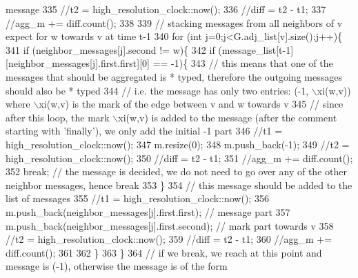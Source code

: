\begin{DoxyCode}
{       message}
335 \textcolor{comment}{          //t2 = high\_resolution\_clock::now();}
336 \textcolor{comment}{          //diff = t2 - t1;}
337 \textcolor{comment}{          //agg\_m += diff.count();}
338 \textcolor{comment}{}
339 \textcolor{comment}{          // stacking messages from all neighbors of v expect for w towards v at time t-1}
340 \textcolor{comment}{          for (int j=0;j<G.adj\_list[v].size();j++)\{}
341 \textcolor{comment}{            if (neighbor\_messages[j].second != w)\{}
342 \textcolor{comment}{              if (message\_list[t-1][neighbor\_messages[j].first.first][0] == -1)\{}
343 \textcolor{comment}{                // this means that one of the messages that should be aggregated is * typed, therefore the
       outgoing messages should also be * typed}
344 \textcolor{comment}{                // i.e. the message has only two entries: (-1, \(\backslash\)xi(w,v)) where \(\backslash\)xi(w,v) is the mark of the
       edge between v and w towards v}
345 \textcolor{comment}{                // since after this loop, the mark \(\backslash\)xi(w,v) is added to the message (after the comment
       starting with 'finally'), we only add the initial -1 part}
346 \textcolor{comment}{                //t1 = high\_resolution\_clock::now();}
347 \textcolor{comment}{                m.resize(0);}
348 \textcolor{comment}{                m.push\_back(-1);}
349 \textcolor{comment}{                //t2 = high\_resolution\_clock::now();}
350 \textcolor{comment}{                //diff = t2 - t1;}
351 \textcolor{comment}{                //agg\_m += diff.count();}
352 \textcolor{comment}{                break; // the message is decided, we do not need to go over any of the other neighbor
       messages, hence break}
353 \textcolor{comment}{              \}}
354 \textcolor{comment}{              // this message should be added to the list of messages}
355 \textcolor{comment}{              //t1 = high\_resolution\_clock::now();}
356 \textcolor{comment}{              m.push\_back(neighbor\_messages[j].first.first); // message part}
357 \textcolor{comment}{              m.push\_back(neighbor\_messages[j].first.second); // mark part towards v}
358 \textcolor{comment}{              //t2 = high\_resolution\_clock::now();}
359 \textcolor{comment}{              //diff = t2 - t1;}
360 \textcolor{comment}{              //agg\_m += diff.count();}
361 \textcolor{comment}{}
362 \textcolor{comment}{            \}}
363 \textcolor{comment}{          \}}
364 \textcolor{comment}{          // if we break, we reach at this point and message is (-1), otherwise the message is of the form
}
\end{DoxyCode}
